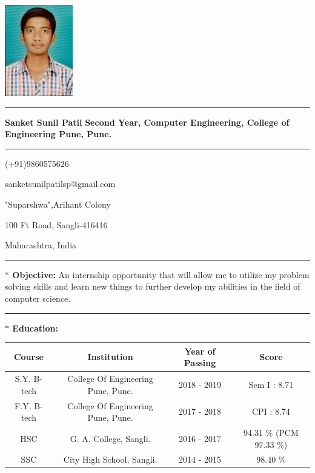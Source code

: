 \documentclass[a4paper,11pt]{article} %
\begin{document}
\raggedleft
\includegraphics{photo}
\smallskip
\hrule
\smallskip
\raggedright
\textbf{{\Huge \sc Sanket Sunil Patil \newline}}
\smallskip
\textbf{\small Second Year, Computer Engineering, College of Engineering Pune, Pune.}
\bigskip

\hrule
\smallskip
\begin{minipage}[b]{0.9\textwidth}
			\raggedleft
			(+91)9860575626\par
			sanketsunilpatilsp@gmail.com\par
		\end{minipage}%

\begin{minipage}[b]{0.33333\textwidth}
			\raggedright
			"Suparshwa",Arihant Colony\par
			100 Ft Road, Sangli-416416\par
			Maharashtra, India
		\end{minipage}

\bigskip


\hrule
\bigskip
\raggedright
		\begin{LARGE}
				
				\textbf{\large $\ast$ Objective:}\medskip\linebreak%
				{\small An internship opportunity that will allow me to utilize my problem solving skills and learn new things to further develop my abilities in the field of computer science.\newline}\bigskip
		\end{LARGE}
\hrule	
\bigskip
\textbf{\large $\ast$ Education:}\smallskip\linebreak
\begin{center}
 \begin{tabular}{||c || c || c || c||} 
 \hline
 Course & Institution & Year of Passing & Score \\ [0.8ex] 
 \hline\hline
 S.Y. B-tech & College Of Engineering Pune, Pune. & 2018 - 2019 & Sem I : 8.71 \\ 
 \hline
 F.Y. B-tech & College Of Engineering Pune, Pune. & 2017 - 2018 & CPI     : 8.74 \\
 \hline
 HSC & G. A. College, Sangli. & 2016 - 2017 & 94.31 \%  (PCM 97.33 \%)\linebreak \\

 \hline
 SSC& City High School, Sangli. & 2014 - 2015 & 98.40 \% \\
 \hline

 \hline
\end{tabular}
\end{center}
\end{document}
